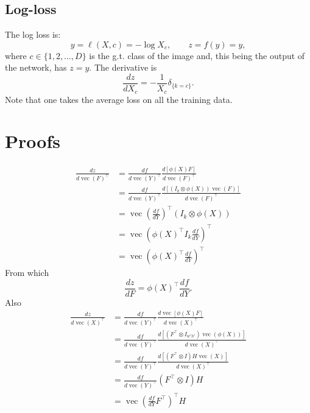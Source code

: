 \documentclass[12pt]{article}
\newcommand{\vv}{\operatorname{vec}}
\begin{document}
\subsection{Log-loss}\label{s:loss}

The log loss is:
\[
 y = \ell(X,c) = - \log X_c, \qquad z = f(y) = y,
\]
where $c \in \{1,2,\dots,D\}$ is the g.t\@. class of the image and, this being the output of the network, has $z=y$. The derivative is
\[
\frac{dz}{dX_c} = - \frac{1}{X_c} \delta_{\{k = c\}}.
\]
Note that one takes the average loss on all the training data.






\appendix\section{Proofs}\label{s:proofs}

\begin{align*}
\frac{d z}{d \vv(F)^\top}
&=
\frac{d f}{d \vv(Y)^\top}
\frac{d [\phi(X) F]}{d\vv(F)^\top}
\\
&=
\frac{d f}{d \vv(Y)^\top}
\frac{d [\left(
I_k \otimes \phi(X)
\right)
\vv(F)]
}{d\vv(F)^\top}
\\
&=
\vv\left(\frac{d f}{d Y} \right)^\top
\left(
I_k \otimes \phi(X)
\right)
\\
&=
\vv\left(
\phi(X)^\top I_k \frac{d f}{d Y} 
\right)^\top
\\
&=
\vv\left(
\phi(X)^\top
\frac{d f}{d Y} 
\right)^\top
\end{align*}
From which
\[
\frac{dz}{dF}
=
\phi(X)^\top\frac{d f}{d Y}.
\]
Also
\begin{align*}
\frac{d z}{d \vv(X)^\top}
&=
\frac{d f}{d \vv(Y)^\top}
\frac{d \vv [\phi(X) F]}{d\vv(X)^\top}
\\
&=
\frac{d f}{d \vv(Y)^\top}
\frac{d [(F^\top \otimes I_{w'h'})\vv(\phi(X))]}{d\vv(X)^\top}
\\
&=
\frac{d f}{d \vv(Y)^\top}
\frac{d [(F^\top \otimes I)H \vv(X)]}{d\vv(X)^\top}
\\
&=
\frac{d f}{d \vv(Y)^\top} (F^\top\otimes I)H
\\
&=
\vv\left(
\frac{d f}{d Y}F^\top
\right)^\top H
\end{align*}
\end{document}
